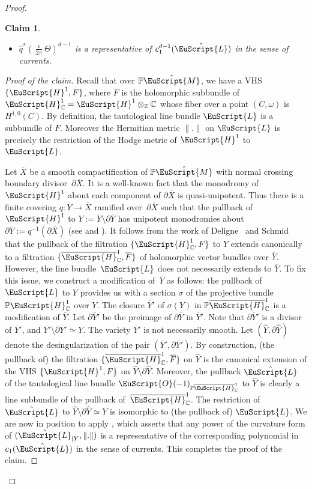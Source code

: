 \documentclass[10pt]{amsart}
\let\mathcal\EuScript
\theoremstyle{plain}
\newtheorem{Claim}[Theorem]{Claim}
\theoremstyle{definition}
\def\C{\mathbb{C}}
\newcommand\Z{\mathbb{Z}}
\newcommand{\Pb}{\mathbb{P}}
\newcommand{\Ocal}{\mathcal{O}}
\newcommand{\cH}{\mathcal{H}}
\newcommand{\cL}{\mathcal{L}}
\newcommand{\cM}{\mathcal{M}}
\let\omg\omega
\let\ol\overline
\begin{document}
\begin{proof}
\begin{Claim}
\begin{itemize}
\item $\hat{q}^*(\frac{\imath}{2\pi}\Theta)^{d-1}$ is a representative of $c^{d-1}_1(\hat{\cL})$ in the sense of currents.
\end{itemize}
\end{Claim}
\begin{proof}[Proof of the claim]
Recall that over $\Pb\hat{\cM}$, we have a VHS $\{\cH^1, F\}$, where $F$ is the holomorphic subbundle of $\cH^1_{\C}=\cH^1\otimes_{\Z}\C$ whose fiber over a point $(C,\omg)$ is $H^{1,0}(C)$. By definition, the tautological line bundle $\cL$ is a subbundle of $F$. Moreover the Hermitian metric $\|.\|$ on $\cL$ is precisely the restriction of the Hodge metric of $\cH^1$ to $\cL$.

Let $\ol{X}$ be a smooth compactification of $\Pb\hat{\cM}$ with normal crossing boundary divi\-sor~$\partial \ol{X}$. It is a well-known fact that the monodromy of $\cH^1$ about each component of $\partial \ol{X}$ is quasi-unipotent. Thus there is a finite covering $q: \ol{Y} \to \ol{X}$ ramified over~$\partial \ol{X}$ such that the pullback of $\cH^1$ to $Y:=\ol{Y}\setminus \partial\ol{Y}$ has unipotent monodromies about $\partial \ol{Y}:=q^{-1}(\partial \ol{X})$ (see \cite[Th.\,17]{Kaw81} and \cite[Lem.\,3.5]{Bru18}). It follows from the work of Deligne~\cite{Del70} and Schmid~\cite{Sch73} that the pullback of the filtration $\{\cH^1_{\C},F\}$ to $Y$ extends canonically to a filtration $\{\ol{\cH}^1_{\C}, \ol{F}\}$ of holomorphic vector bundles over $\ol{Y}$.
However, the line bundle~$\cL$ does not necessarily extends to $\ol{Y}$.
To fix this issue, we construct a modification of~$\ol{Y}$ as follows: the pullback of $\cL$ to $Y$ provides us with a section $\sigma$ of the projective bundle $\Pb\cH^1_{\C}$ over $Y$. The closure $\ol{Y}'$ of $\sigma(Y)$ in $\Pb\ol{\cH}^1_{\C}$ is a modification of $\ol{Y}$. Let $\partial \ol{Y}'$ be the preimage of $\partial \ol{Y}$ in $\ol{Y}'$. Note that $\partial\ol{Y}'$ is a divisor of $\ol{Y}'$, and $\ol{Y}'\setminus\partial\ol{Y}'\simeq Y$. The variety $\ol{Y}'$ is not necessarily smooth. Let $(\hat{Y},\partial\hat{Y})$ denote the desingularization of the pair $(\ol{Y}',\partial \ol{Y}')$. By construction, (the pullback of) the filtration $\{\ol{\cH}^1_{\C}, \ol{F}\}$ on $\hat{Y}$ is the canonical extension of the VHS $\{\cH^1,F\}$ on $\hat{Y}\setminus\partial\hat{Y}$. Moreover, the pullback $\hat{\cL}$ of the tautological line bundle $\Ocal(-1)_{\Pb\ol{\cH}^1_{\C}}$ to $\hat{Y}$ is clearly a line subbundle of the pullback of~$\ol{\cH}^1_{\C}$.
The restriction of $\hat{\cL}$ to $\hat{Y}\setminus\partial\hat{Y}\simeq Y$ is isomorphic to (the pullback of) $\cL$.
We are now in position to apply \cite[Th.\,5.1 and Remark 5.19]{Kollar87}, which asserts that any power of the curvature form of $(\hat{\cL}_{|Y}, \|.\|)$ is a representative of the corresponding polynomial in $c_1(\hat{\cL})$ in the sense of currents. This completes the proof of the claim.
\end{proof}


\end{proof}
\end{document}
